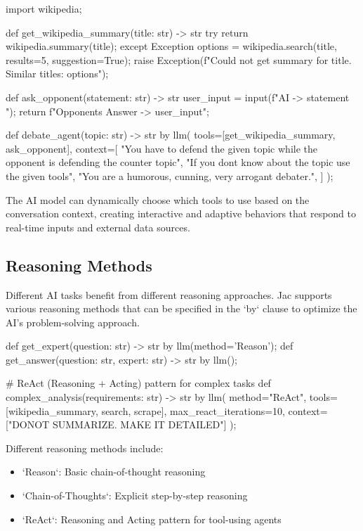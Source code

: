 \begin{jacblock}
import wikipedia;

def get_wikipedia_summary(title: str) -> str {
    try {
        return wikipedia.summary(title);
    } except Exception {
        options = wikipedia.search(title, results=5, suggestion=True);
        raise Exception(f"Could not get summary for {title}. Similar titles: {options}");
    }
}

def ask_opponent(statement: str) -> str {
    user_input = input(f"AI -> {statement} ");
    return f"Opponents Answer -> {user_input}";
}

def debate_agent(topic: str) -> str by llm(
    tools=[get_wikipedia_summary, ask_opponent],
    context=[
        "You have to defend the given topic while the opponent is defending the counter topic",
        "If you dont know about the topic use the given tools",
        "You are a humorous, cunning, very arrogant debater.",
    ]
);
\end{jacblock}

The AI model can dynamically choose which tools to use based on the conversation context, creating interactive and adaptive behaviors that respond to real-time inputs and external data sources.

\subsection{Reasoning Methods}

Different AI tasks benefit from different reasoning approaches. Jac supports various reasoning methods that can be specified in the `by` clause to optimize the AI's problem-solving approach.

\begin{jacblock}
def get_expert(question: str) -> str by llm(method='Reason');
def get_answer(question: str, expert: str) -> str by llm();

# ReAct (Reasoning + Acting) pattern for complex tasks
def complex_analysis(requirements: str) -> str by llm(
    method="ReAct",
    tools=[wikipedia_summary, search, scrape],
    max_react_iterations=10,
    context=["DONOT SUMMARIZE. MAKE IT DETAILED"]
);
\end{jacblock}

Different reasoning methods include:
\begin{itemize}
    \item `Reason`: Basic chain-of-thought reasoning
    \item `Chain-of-Thoughts`: Explicit step-by-step reasoning
    \item `ReAct`: Reasoning and Acting pattern for tool-using agents
\end{itemize}

